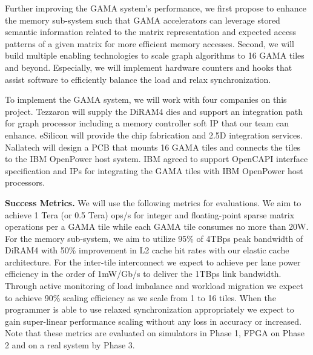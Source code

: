 Further improving the GAMA system's performance,  %
we first propose to enhance the memory sub-system such that GAMA accelerators can leverage stored semantic information related to the matrix representation and expected access patterns of a given matrix for more efficient memory accesses.   
Second, we will build multiple enabling technologies to scale graph algorithms to 16 GAMA tiles and beyond. 
Especially, we will implement hardware counters and hooks that assist software to efficiently balance the load and relax synchronization.




To implement the GAMA system, %
we will work with 
four companies on this project. 
Tezzaron will supply the DiRAM4 dies and support an integration path for graph processor including a memory controller soft IP that our team can enhance.
eSilicon will provide the chip fabrication and 2.5D integration services.
Nallatech will design a PCB that mounts 16 GAMA tiles and connects the tiles to the IBM OpenPower host system. %
IBM agreed to support OpenCAPI interface specification and IPs for integrating the GAMA tiles with IBM OpenPower host processors. 

\vspace{3pt}
\noindent
\textbf{Success Metrics.} 
We will use the following metrics for evaluations.
We aim to achieve 1 Tera (or 0.5 Tera) ops/s for integer and floating-point sparse matrix operations per a GAMA tile while each GAMA tile consumes no more than 20W.
For the memory sub-system, we aim to utilize 95\% of 4TBps peak bandwidth of DiRAM4 with 50\% improvement in L2 cache hit rates with our elastic cache architecture.
For the inter-tile interconnect we expect to achieve per lane power efficiency in the order of 1mW/Gb/s to deliver the 1TBps link bandwidth. %
Through active monitoring of load imbalance and workload migration we expect to achieve 90\% scaling efficiency as we scale from 1 to 16 tiles. 
When the programmer is able to use relaxed synchronization appropriately we expect to gain super-linear performance scaling without any loss in accuracy or increased.  
Note that these metrics are evaluated on simulators in Phase 1, FPGA on Phase 2 and on a real system by Phase 3.  

